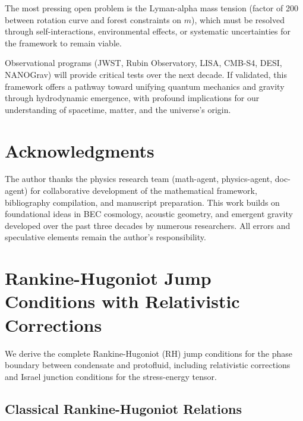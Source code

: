 \documentclass[11pt,a4paper]{article}
\theoremstyle{definition}
\theoremstyle{remark}
\begin{document}
The most pressing open problem is the Lyman-alpha mass tension (factor of 200 between rotation curve and forest constraints on $m$), which must be resolved through self-interactions, environmental effects, or systematic uncertainties for the framework to remain viable.

Observational programs (JWST, Rubin Observatory, LISA, CMB-S4, DESI, NANOGrav) will provide critical tests over the next decade. If validated, this framework offers a pathway toward unifying quantum mechanics and gravity through hydrodynamic emergence, with profound implications for our understanding of spacetime, matter, and the universe's origin.

\section*{Acknowledgments}

The author thanks the physics research team (math-agent, physics-agent, doc-agent) for collaborative development of the mathematical framework, bibliography compilation, and manuscript preparation. This work builds on foundational ideas in BEC cosmology, acoustic geometry, and emergent gravity developed over the past three decades by numerous researchers. All errors and speculative elements remain the author's responsibility.

\appendix

\section{Rankine-Hugoniot Jump Conditions with Relativistic Corrections}
\label{app:rankine_hugoniot}

We derive the complete Rankine-Hugoniot (RH) jump conditions for the phase boundary between condensate and protofluid, including relativistic corrections and Israel junction conditions for the stress-energy tensor.

\subsection{Classical Rankine-Hugoniot Relations}
\label{sec:rh_classical}
\end{document}
